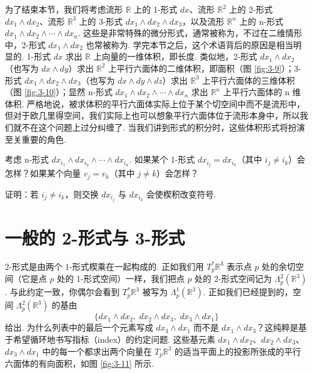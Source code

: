 为了结束本节，我们将考虑流形 $\mathbb{R}$ 上的 1-形式 $dx$、流形 $\mathbb{R}^2$ 上的 2-形式 $dx_1\wedge dx_2$、流形 $\mathbb{R}^3$ 上的 3-形式 $dx_1\wedge dx_2\wedge dx_3$，以及流形 $\mathbb{R}^n$ 上的 n-形式 $dx_1\wedge dx_2\wedge\cdots\wedge dx_n$. 这些是非常特殊的微分形式，通常被称为，不过在二维情形中，2-形式 $dx_1\wedge dx_2$ 也常被称为. 学完本节之后，这个术语背后的原因是相当明显的. 1-形式 $dx$ 求出 $\mathbb{R}$ 上向量的一维体积，即长度. 类似地，2-形式 $dx_1\wedge dx_2$（也写为 $dx\wedge dy$）求出 $\mathbb{R}^2$ 上平行六面体的二维体积，即面积（图 \ref{fig:3-9}）；3-形式 $dx_1\wedge dx_2\wedge dx_3$（也写为 $dx\wedge dy\wedge dz$）求出 $\mathbb{R}^3$ 上平行六面体的三维体积（图 \ref{fig:3-10}）；显然 n-形式 $dx_1\wedge dx_2\wedge\cdots\wedge dx_n$ 求出 $\mathbb{R}^n$ 上平行六面体的 n 维体积. 严格地说，被求体积的平行六面体实际上位于某个切空间中而不是流形中，但对于欧几里得空间，我们实际上也可以想象平行六面体位于流形本身中，所以我们就不在这个问题上过分纠缠了. 当我们讲到形式的积分时，这些体积形式将扮演至关重要的角色.

\begin{question}\label{q:3-4}
考虑 n-形式 $dx_{i_1}\wedge dx_{i_2}\wedge\cdots\wedge dx_{i_n}$. 如果某个 1-形式 $dx_{i_j}=dx_{i_k}$（其中 $i_j\neq i_k$）会怎样？如果某个向量 $v_j=v_k$（其中 $j\neq k$）会怎样？
\end{question}

\begin{question}\label{q:3-5}
证明：若 $i_j\neq i_k$，则交换 $dx_{i_j}$ 与 $dx_{i_k}$ 会使楔积改变符号.
\end{question}

\section{一般的 2-形式与 3-形式}

2-形式是由两个 1-形式楔乘在一起构成的. 正如我们用 $T_p^*\mathbb{R}^3$ 表示点 $p$ 处的余切空间（它是点 $p$ 处的 1-形式空间）一样，我们把点 $p$ 处的 2-形式空间记为 $\Lambda_p^2(\mathbb{R}^3)$. 与此约定一致，你偶尔会看到 $T_p^*\mathbb{R}^3$ 被写为 $\Lambda_p^1(\mathbb{R}^3)$. 正如我们已经提到的，空间 $\Lambda_p^2(\mathbb{R}^3)$ 的基由
\[
\{dx_1\wedge dx_2,\;dx_2\wedge dx_3,\;dx_3\wedge dx_1\}
\]
给出. 为什么列表中的最后一个元素写成 $dx_3\wedge dx_1$ 而不是 $dx_1\wedge dx_3$？这纯粹是基于希望循环地书写指标（index）的约定问题. 这些基元素 $dx_1\wedge dx_2$、$dx_2\wedge dx_3$、$dx_3\wedge dx_1$ 中的每一个都求出两个向量在 $T_p\mathbb{R}^3$ 的适当平面上的投影所张成的平行六面体的有向面积，如图 \ref{fig:3-11} 所示.

